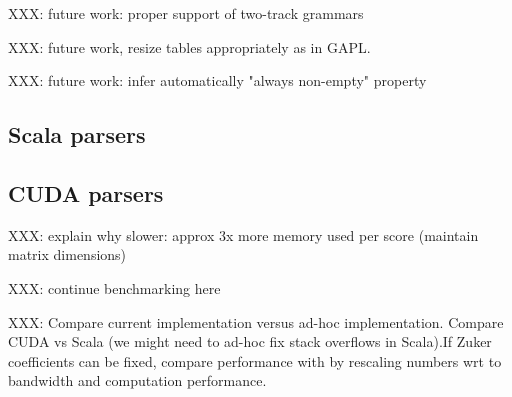 XXX: future work: proper support of two-track grammars

XXX: future work, resize tables appropriately as in GAPL.

XXX: future work: infer automatically "always non-empty" property

\subsection{Scala parsers}

\subsection{CUDA parsers}
{\color{red} XXX: explain why slower: approx 3x more memory used per score (maintain matrix dimensions)

XXX: continue benchmarking here
}

{\color{red} XXX: Compare current implementation versus ad-hoc implementation. Compare CUDA vs Scala (we might need to ad-hoc fix stack overflows in Scala).If Zuker coefficients can be fixed, compare performance with \cite{adp_gpu} by rescaling numbers wrt to bandwidth and computation performance.}

%

